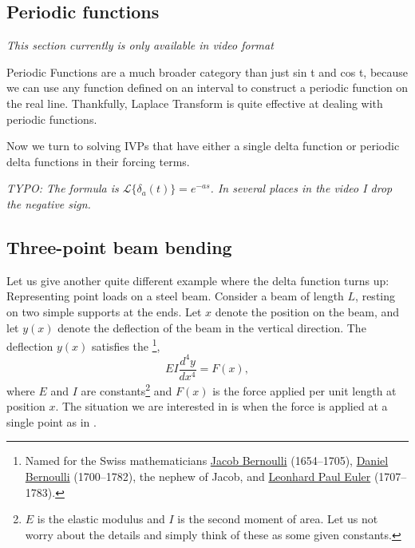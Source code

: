 \subsection{Periodic functions}

\emph{This section currently is only available in video format}
\begin{video}
	Periodic Functions are a much broader category than just sin t and cos t, because we can use any function defined on an interval to construct a periodic function on the real line. Thankfully, Laplace Transform is quite effective at dealing with periodic functions. 
\end{video}

\begin{video}
	Now we turn to solving IVPs that have either a single delta function or periodic delta functions in their forcing terms. 

	\emph{TYPO: The formula is $\mathcal{L}\{\delta_a(t)\}=e^{-as}$. In several places in the video I drop the negative sign.}
\end{video}



\subsection{Three-point beam bending}

Let us give another quite different
example where the delta function turns up:
Representing point loads on a steel beam.  Consider a beam
of length $L$, resting on two simple supports at the ends.  Let $x$ denote
the position on the beam, and let $y(x)$ denote the deflection of the beam in
the vertical direction.  The deflection $y(x)$ satisfies the
\emph{}%
\footnote{Named for the Swiss mathematicians
\href{https://en.wikipedia.org/wiki/Jacob_Bernoulli}{Jacob Bernoulli}
(1654--1705),
\href{https://en.wikipedia.org/wiki/Daniel_Bernoulli}{Daniel Bernoulli}
(1700--1782), the nephew of Jacob,
and
\href{https://en.wikipedia.org/wiki/Euler}{Leonhard Paul Euler}
(1707--1783).},
\begin{equation*}
EI \frac{d^4 y}{dx^4} = F(x) ,
\end{equation*}
where $E$ and $I$ are constants\footnote{$E$ is the elastic modulus and $I$
is the second moment of area.  Let us not worry about the details and simply
think of these as some given constants.} and
$F(x)$ is the force applied per unit length at position $x$.  The situation
we are interested in is when the force is applied at a single point as in
.

